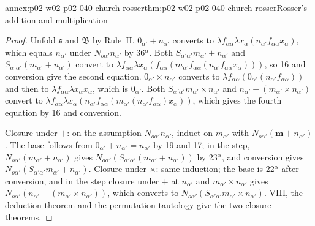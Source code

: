 \begin{annexitem}{annex:p02-w02-p02-040-church-rosser}{thm:p02-w02-p02-040-church-rosser}{Rosser's addition and multiplication}
\begin{proof}
Unfold \(\mathfrak s\) and \(\mathfrak B\) by Rule~II.
\(0_{\alpha'}+n_{\alpha'}\) converts to
\(\lambda f_{\alpha\alpha}\lambda x_\alpha(n_{\alpha'}f_{\alpha\alpha}x_\alpha)\),
which equals \(n_{\alpha'}\) under \(N_{o\alpha'}n_{\alpha'}\) by 36\(^\alpha\).
Both \(S_{\alpha'\alpha'}m_{\alpha'}+n_{\alpha'}\) and
\(S_{\alpha'\alpha'}(m_{\alpha'}+n_{\alpha'})\) convert to
\(\lambda f_{\alpha\alpha}\lambda x_\alpha(f_{\alpha\alpha}(m_{\alpha'}f_{\alpha\alpha}(n_{\alpha'}f_{\alpha\alpha}x_\alpha)))\),
so 16 and conversion give the second equation.
\(0_{\alpha'}\times n_{\alpha'}\) converts to
\(\lambda f_{\alpha\alpha}(0_{\alpha'}(n_{\alpha'}f_{\alpha\alpha}))\) and then to
\(\lambda f_{\alpha\alpha}\lambda x_\alpha x_\alpha\), which is \(0_{\alpha'}\).
Both \(S_{\alpha'\alpha'}m_{\alpha'}\times n_{\alpha'}\) and
\(n_{\alpha'}+(m_{\alpha'}\times n_{\alpha'})\) convert to
\(\lambda f_{\alpha\alpha}\lambda x_\alpha(n_{\alpha'}f_{\alpha\alpha}(m_{\alpha'}(n_{\alpha'}f_{\alpha\alpha})x_\alpha))\),
which gives the fourth equation by 16 and conversion.

Closure under \(+\): on the assumption \(N_{o\alpha'}n_{\alpha'}\), induct on
\(m_{\alpha'}\) with \(N_{o\alpha'}(\mathbf m+n_{\alpha'})\).  The base follows
from \(0_{\alpha'}+n_{\alpha'}=n_{\alpha'}\) by 19 and 17; in the step,
\(N_{o\alpha'}(m_{\alpha'}+n_{\alpha'})\) gives
\(N_{o\alpha'}(S_{\alpha'\alpha'}(m_{\alpha'}+n_{\alpha'}))\) by 23\(^\alpha\), and
conversion gives \(N_{o\alpha'}(S_{\alpha'\alpha'}m_{\alpha'}+n_{\alpha'})\).
Closure under \(\times\): same induction; the base is 22\(^\alpha\) after
conversion, and in the step closure under \(+\) at \(n_{\alpha'}\) and
\(m_{\alpha'}\times n_{\alpha'}\) gives \(N_{o\alpha'}(n_{\alpha'}+(m_{\alpha'}\times n_{\alpha'}))\),
which converts to \(N_{o\alpha'}(S_{\alpha'\alpha'}m_{\alpha'}\times n_{\alpha'})\).
VIII, the deduction theorem and the permutation tautology give the two
closure theorems.
\end{proof}
\end{annexitem}

